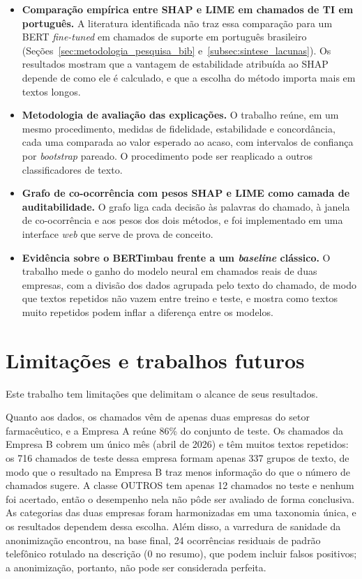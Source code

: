 \documentclass[
    12pt,                %
    openright,           %
    oneside,             %
    a4paper,             %
    english,             %
    brazil               %
]{abntex2}
\begin{document}
\begin{itemize}
    \item \textbf{Comparação empírica entre SHAP e LIME em chamados de TI em português.} A literatura identificada não traz essa comparação para um BERT \textit{fine-tuned} em chamados de suporte em português brasileiro (Seções~\ref{sec:metodologia_pesquisa_bib} e~\ref{subsec:sintese_lacunas}). Os resultados mostram que a vantagem de estabilidade atribuída ao SHAP depende de como ele é calculado, e que a escolha do método importa mais em textos longos.
 
    \item \textbf{Metodologia de avaliação das explicações.} O trabalho reúne, em um mesmo procedimento, medidas de fidelidade, estabilidade e concordância, cada uma comparada ao valor esperado ao acaso, com intervalos de confiança por \textit{bootstrap} pareado. O procedimento pode ser reaplicado a outros classificadores de texto.
 
    \item \textbf{Grafo de co-ocorrência com pesos SHAP e LIME como camada de auditabilidade.} O grafo liga cada decisão às palavras do chamado, à janela de co-ocorrência e aos pesos dos dois métodos, e foi implementado em uma interface \textit{web} que serve de prova de conceito.
 
    \item \textbf{Evidência sobre o BERTimbau frente a um \textit{baseline} clássico.} O trabalho mede o ganho do modelo neural em chamados reais de duas empresas, com a divisão dos dados agrupada pelo texto do chamado, de modo que textos repetidos não vazem entre treino e teste, e mostra como textos muito repetidos podem inflar a diferença entre os modelos.
\end{itemize}

\section{Limitações e trabalhos futuros}
Este trabalho tem limitações que delimitam o alcance de seus resultados.

Quanto aos dados, os chamados vêm de apenas duas empresas do setor farmacêutico, e a Empresa A reúne 86\% do conjunto de teste. Os chamados da Empresa B cobrem um único mês (abril de 2026) e têm muitos textos repetidos: os 716 chamados de teste dessa empresa formam apenas 337 grupos de texto, de modo que o resultado na Empresa B traz menos informação do que o número de chamados sugere. A classe OUTROS tem apenas 12 chamados no teste e nenhum foi acertado, então o desempenho nela não pôde ser avaliado de forma conclusiva. As categorias das duas empresas foram harmonizadas em uma taxonomia única, e os resultados dependem dessa escolha. Além disso, a varredura de sanidade da anonimização encontrou, na base final, 24 ocorrências residuais de padrão telefônico rotulado na descrição (0 no resumo), que podem incluir falsos positivos; a anonimização, portanto, não pode ser considerada perfeita.
\end{document}
